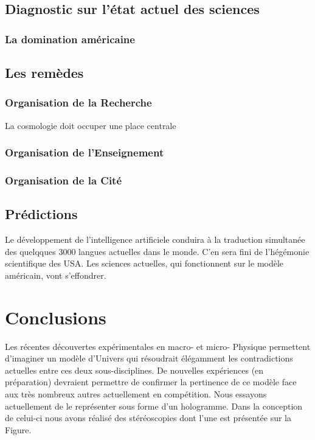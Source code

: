 \documentclass[a4paper,12pt]{article}
\begin{document}
\subsection {Diagnostic sur l'état actuel des sciences}
\subsubsection{La domination américaine}



\subsection {Les remèdes} 
\subsubsection {Organisation de la Recherche}
La cosmologie doit occuper une place centrale
\subsubsection {Organisation de l'Enseignement}
\subsubsection {Organisation de la Cité}


\subsection {Prédictions}
Le développement de l'intelligence artificiele conduira à la traduction simultanée des quelqques 3000 langues actuelles dans le monde. C'en sera fini de l'hégémonie scientifique des USA.
Les sciences actuelles, qui fonctionnent sur le modèle américain, vont s'effondrer. 









\section{Conclusions}
\label{sec:headings}

Les récentes découvertes expérimentales en macro- et micro- Physique permettent d'imaginer un modèle d'Univers qui résoudrait élégamment les contradictions actuelles entre ces deux sous-disciplines. De nouvelles expériences (en préparation) devraient permettre de confirmer la pertinence de ce modèle face aux très nombreux autres actuellement en compétition. Nous essayons actuellement de le représenter sous forme d'un hologramme. Dans la conception de celui-ci nous avons réalisé des stéréoscopies dont l'une est présentée sur la Figure.
\end{document}
